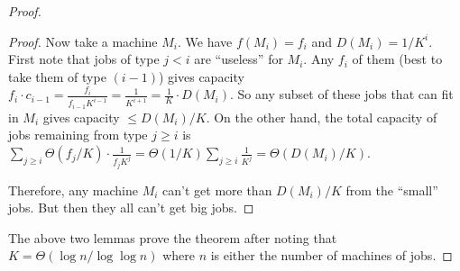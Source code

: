 \documentclass{article}[11pt]
\begin{document}
\begin{proof}
\begin{proof}
Now take a machine $M_i$. We have $f(M_i) = f_i$ and $D(M_i) = 1/K^i$. 
First note that jobs of type $j < i$ are ``useless'' for $M_i$. Any $f_i$ of them (best to take them of type $(i-1)$)  gives capacity $f_i\cdot c_{i-1}  = \frac{f_i}{f_{i-1}K^{i-1}} = \frac{1}{K^{i+1}} =  \frac{1}{K}\cdot D(M_i)$. So any subset of these jobs that can fit in $M_i$ gives capacity $\leq D(M_i)/K$.
On the other hand, the total capacity of jobs remaining from type $j \geq i$ is  $\sum_{j\geq i} \Theta(f_j/K)\cdot \frac{1}{f_jK^j} = \Theta(1/K)\sum_{j\geq i} \frac{1}{K^j} = \Theta(D(M_i)/K)$.

Therefore, any machine $M_i$ can't get more than $D(M_i)/K$ from the ``small'' jobs. But then they all can't get big jobs. 
\end{proof}
The above two lemmas prove the theorem after noting that $K = \Theta(\log n/\log\log n)$ where $n$ is either the number of machines of jobs.
\end{proof}
\end{document}
